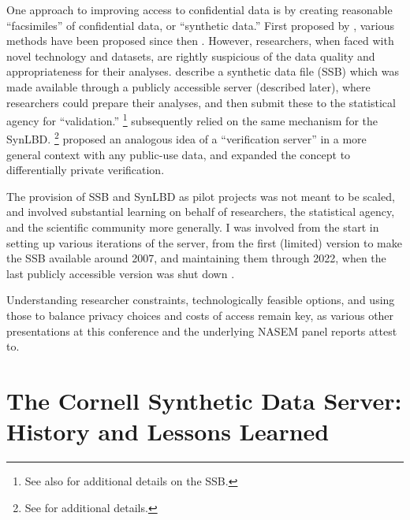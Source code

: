 \documentclass[12pt]{article}
\begin{document}
One approach to improving access to confidential data is by creating reasonable ``facsimiles'' of confidential data, or ``synthetic data.'' First proposed by \citet{rubin_discussion_1993}, various methods have been proposed since then \citep[see ][ for overviews]{VilhuberAbowdReiter-SJIAOS2016,raghunathan_synthetic_2021}. However, researchers, when faced with novel technology and datasets, are rightly suspicious of the data quality and appropriateness for their analyses.  \citet{abowd_final_2006} describe a synthetic data file (\ac{SSB}) which was made available through a publicly accessible server (described later), where researchers could prepare their analyses, and then submit these to the statistical agency for ``validation.''%
%
\footnote{See also \citet{Benedettoetal_2013,us_census_bureau_sipp_2015,reeder_codebook_2018} for additional details on the \ac{SSB}.}
%
\citet{KinneyEtAl2011} subsequently relied on the same mechanism for the \ac{SynLBD}.%
%
\footnote{See  \citep{us_census_bureau_synthetic_2011,vilhuber_codebook_2013,SJIAOS-2014d} for additional details.}
%
\citet{reiter_verification_2009} proposed an analogous idea of a ``verification server'' in a more general context with any public-use data, and \citet{barrientos_providing_2018} expanded the concept to differentially private verification. 

The provision of \ac{SSB} and \ac{SynLBD} as pilot projects was not meant to be scaled, and involved substantial learning on behalf of researchers, the statistical agency, and the scientific community more generally.
I was involved from the start in setting up various iterations of the server, from the first (limited) version to make the \ac{SSB} available around 2007, and maintaining them through 2022, when the last publicly accessible version was shut down \citep{vilhuber_end_2022}. 

Understanding researcher constraints, technologically feasible options, and using those to balance privacy choices and costs of access remain key, as various other presentations at this conference \citep{jerry-nber-2024,raghu-nber-2024} and the underlying \ac{NASEM} panel reports \citep{raghunathan_roadmap_2023b,reiter_toward_2024b} attest to.


\section{The Cornell Synthetic Data Server: History and Lessons Learned}
\end{document}
